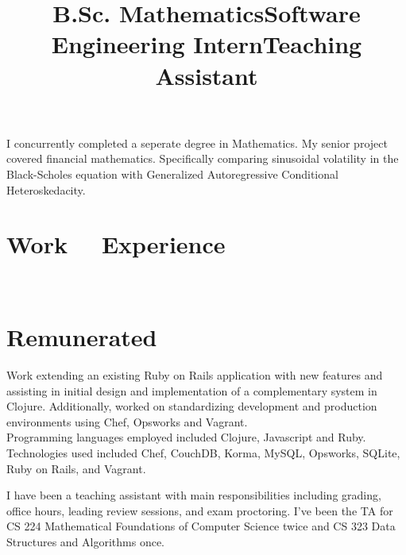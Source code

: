 \documentclass[margintitle,line]{res}
\renewcommand{\subsection}[1]{\section{\normalfont #1}}
\begin{document}
\begin{resume}
\title{B.Sc. Mathematics}
\begin{position}
I concurrently completed a seperate degree in Mathematics. My senior project covered financial mathematics. Specifically comparing sinusoidal volatility in the Black-Scholes equation with Generalized Autoregressive Conditional Heteroskedacity.
\end{position}



\section{Work \ \ Experience}
\ \\
\subsection{Remunerated}

\title{Software Engineering Intern}
\begin{position}
 Work extending an existing Ruby on Rails application with new features and assisting in initial design and implementation of a complementary system in  Clojure. Additionally, worked on standardizing development and production environments using Chef, Opsworks and Vagrant. \\
 Programming languages employed included Clojure, Javascript and Ruby. \\
 Technologies used included Chef, CouchDB, Korma, MySQL, Opsworks, SQLite, Ruby on Rails, and Vagrant.
\end{position}

\title{Teaching Assistant}
\begin{position}
 I have been a teaching assistant with main responsibilities including grading, office hours, leading review sessions, and exam proctoring. I've been the TA for CS 224 Mathematical Foundations of Computer Science twice  and CS 323 Data Structures and Algorithms once.
\end{position}


\end{resume}
\end{document}
